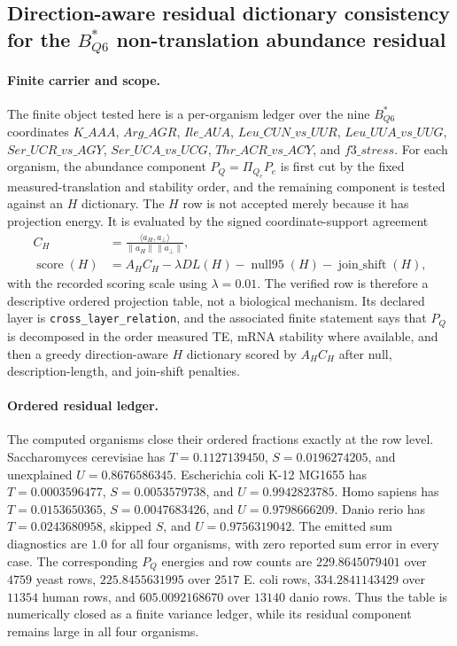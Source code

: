 \subsection{Direction-aware residual dictionary consistency for the $B^\ast_{Q6}$ non-translation abundance residual}
\label{subsec:bq6-direction-aware-residual-dictionary-consistency}

\paragraph{Finite carrier and scope.}
The finite object tested here is a per-organism ledger over the nine $B^\ast_{Q6}$ coordinates
$K\_AAA$, $Arg\_AGR$, $Ile\_AUA$, $Leu\_CUN\_vs\_UUR$, $Leu\_UUA\_vs\_UUG$, $Ser\_UCR\_vs\_AGY$, $Ser\_UCA\_vs\_UCG$, $Thr\_ACR\_vs\_ACY$, and $f3\_stress$.  For each organism, the abundance component $P_Q=\Pi_{Q_e}P_e$ is first cut by the fixed measured-translation and stability order, and the remaining component is tested against an $H$ dictionary.  The $H$ row is not accepted merely because it has projection energy.  It is evaluated by the signed coordinate-support agreement
$$
\begin{aligned}
C_H &= \frac{\langle a_H,a_\perp\rangle}{\lVert a_H\rVert\lVert a_\perp\rVert},\\
\operatorname{score}(H) &= A_H C_H-\lambda DL(H)-\operatorname{null95}(H)-\operatorname{join\_shift}(H),
\end{aligned}
$$
with the recorded scoring scale using $\lambda=0.01$.  The verified row is therefore a descriptive ordered projection table, not a biological mechanism.  Its declared layer is \texttt{cross\_layer\_relation}, and the associated finite statement says that $P_Q$ is decomposed in the order measured TE, mRNA stability where available, and then a greedy direction-aware $H$ dictionary scored by $A_HC_H$ after null, description-length, and join-shift penalties.

\paragraph{Ordered residual ledger.}
The computed organisms close their ordered fractions exactly at the row level.  Saccharomyces cerevisiae has $T=0.1127139450$, $S=0.0196274205$, and unexplained $U=0.8676586345$.  Escherichia coli K-12 MG1655 has $T=0.0003596477$, $S=0.0053579738$, and $U=0.9942823785$.  Homo sapiens has $T=0.0153650365$, $S=0.0047683426$, and $U=0.9798666209$.  Danio rerio has $T=0.0243680958$, skipped $S$, and $U=0.9756319042$.  The emitted sum diagnostics are $1.0$ for all four organisms, with zero reported sum error in every case.  The corresponding $P_Q$ energies and row counts are $229.8645079401$ over $4759$ yeast rows, $225.8455631995$ over $2517$ E. coli rows, $334.2841143429$ over $11354$ human rows, and $605.0092168670$ over $13140$ danio rows.  Thus the table is numerically closed as a finite variance ledger, while its residual component remains large in all four organisms.


